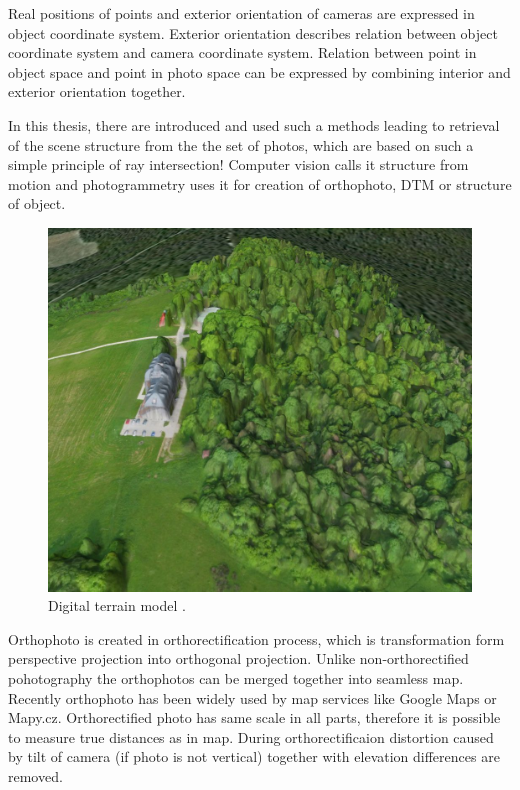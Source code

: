 \documentclass[a4paper,12pt]{article}
\begin{document}
Real positions of points and exterior orientation of cameras are expressed in object coordinate system. 
Exterior orientation describes relation between object coordinate system and camera coordinate system. 
Relation between point in object 
space and point in photo space can be expressed by combining interior and exterior orientation together.

In this thesis, there are introduced and used such a methods leading to retrieval of the scene structure from the 
the set of photos, which are based on such a simple principle of ray intersection! Computer vision calls it structure from motion 
and photogrammetry uses it for creation of orthophoto, DTM or structure of object.

\begin{figure}[h]
    \centering
    \includegraphics[scale=0.3]{figures/dtm.jpg}
    \caption{Digital terrain model \cite{kbosak2010bezmiechowa}.}
\end{figure}

Orthophoto is created in 
orthorectification process, which is transformation form perspective projection into orthogonal projection.
Unlike non-orthorectified pohotography the orthophotos can be merged together into seamless map. Recently 
orthophoto has been widely used by map services like Google Maps or Mapy.cz. Orthorectified photo 
has same scale in all parts, therefore it is possible to measure true distances as in map. During orthorectificaion distortion 
caused by tilt of camera (if photo is not vertical) together with elevation differences are removed.
\end{document}

